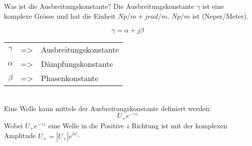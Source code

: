 \begin{karte}{Was ist die Ausbreitungskonstante?}
	Die Ausbreitungskonstante $\gamma$ ist eine komplexe Grösse und hat die Einheit $Np/m + jrad/m$. $Np/m$ ist (Neper/Meter).\\[7pt]
	\begin{minipage}[c]{0.38\textwidth}
		\begin{equation*}
		\gamma = \alpha + j \beta
		\end{equation*}
	\end{minipage}
	\begin{minipage}[t]{0.68\textwidth}
		\begin{tabular}{ccl}
			$\gamma$ & => & Ausbreitungskonstante\\
			$\alpha$ & => & Dämpfungskonstante\\
			$\beta$  & => & Phasenkonstante
		\end{tabular}
	\end{minipage}\\[7pt]
	
	Eine Welle kann mittels der Ausbreitungskonstante definiert werden:
	\begin{equation*}
		U_+ e^{-\gamma z}
	\end{equation*}
	Wobei $U_+ e^{-\gamma z}$ eine Welle in die Positive $z$ Richtung ist mit der komplexen Amplitude $U_+=|U_+| e^{j \varphi_+}$
	
\end{karte}
